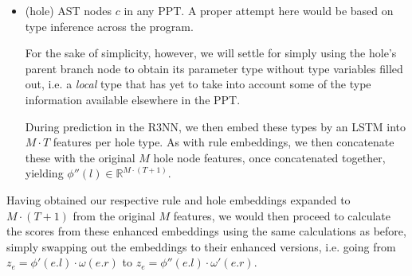 \documentclass{article} %
\begin{document}
\begin{itemize}
    \item (hole) AST nodes $c$ in any PPT.
    A proper attempt here would be based on type inference across the program.

    For the sake of simplicity, however, we will settle for simply using the hole's
    parent branch node to obtain its parameter type without type variables filled out,
    i.e. a \emph{local} type that has yet to take into account some of the type information available elsewhere in the PPT.

    During prediction in the R3NN, we then embed these types by an LSTM into $M \cdot T$ features per hole type.
    As with rule embeddings, we then concatenate these with the original $M$ hole node features,
    once concatenated together, yielding $\phi''(l) \in \mathbb{R}^{M \cdot (T+1)}$.

\end{itemize}

Having obtained our respective rule and hole embeddings expanded to $M \cdot (T+1)$ from the original $M$ features,
we would then proceed to calculate the scores from these enhanced embeddings using the same calculations as before,
simply swapping out the embeddings to their enhanced versions,
i.e. going from $z_e = \phi'(e.l) \cdot \omega(e.r)$ to $z_e = \phi''(e.l) \cdot \omega'(e.r)$.
\end{document}
